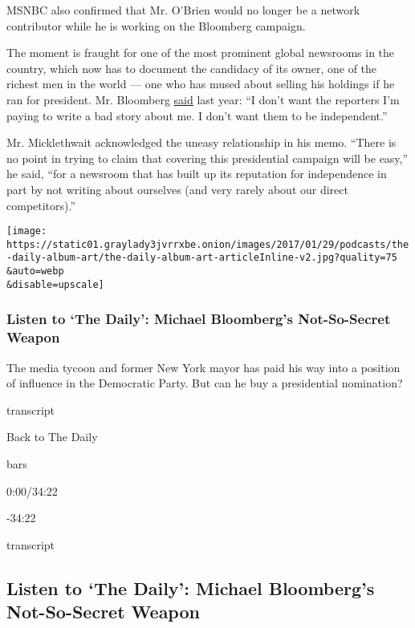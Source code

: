 MSNBC also confirmed that Mr. O'Brien would no longer be a network
contributor while he is working on the Bloomberg campaign.

The moment is fraught for one of the most prominent global newsrooms in
the country, which now has to document the candidacy of its owner, one
of the richest men in the world --- one who has mused about selling his
holdings if he ran for president. Mr. Bloomberg
\href{https://www.thewrap.com/mike-bloomberg-says-hell-sell-his-media-company-if-he-runs-for-president/}{said}
last year: ``I don't want the reporters I'm paying to write a bad story
about me. I don't want them to be independent.''

Mr. Micklethwait acknowledged the uneasy relationship in his memo.
``There is no point in trying to claim that covering this presidential
campaign will be easy,'' he said, ``for a newsroom that has built up its
reputation for independence in part by not writing about ourselves (and
very rarely about our direct competitors).''

\texttt{[image: https://static01.graylady3jvrrxbe.onion/images/2017/01/29/podcasts/the-daily-album-art/the-daily-album-art-articleInline-v2.jpg?quality=75\\\&auto=webp\\\&disable=upscale]}

\hypertarget{listen-to-the-daily-michael-bloombergs-not-so-secret-weapon}{%
\subsubsection{Listen to `The Daily': Michael Bloomberg's Not-So-Secret
Weapon}\label{listen-to-the-daily-michael-bloombergs-not-so-secret-weapon}}

The media tycoon and former New York mayor has paid his way into a
position of influence in the Democratic Party. But can he buy a
presidential nomination?

transcript

Back to The Daily

bars

0:00/34:22

-34:22

transcript

\hypertarget{listen-to-the-daily-michael-bloombergs-not-so-secret-weapon-1}{%
\subsection{Listen to `The Daily': Michael Bloomberg's Not-So-Secret
Weapon}\label{listen-to-the-daily-michael-bloombergs-not-so-secret-weapon-1}}

